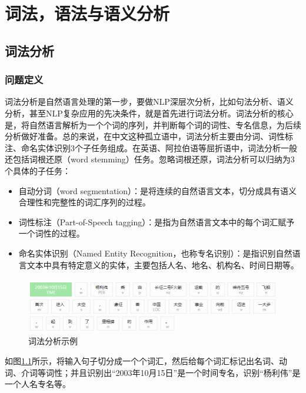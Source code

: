 
\chapter{词法，语法与语义分析}
\label{basic} %

\section{词法分析}
\subsection{问题定义}
词法分析是自然语言处理的第一步，要做NLP深层次分析，比如句法分析、语义分析，甚至NLP复杂应用的先决条件，就是首先进行词法分析。词法分析的核心是，将自然语言解析为一个个词的序列，并判断每个词的词性、专名信息，为后续分析做好准备。总的来说，在中文这种孤立语中，词法分析主要由分词、词性标注、命名实体识别3个子任务组成。在英语、阿拉伯语等屈折语中，词法分析一般还包括词根还原（word stemming）任务。忽略词根还原，词法分析可以归纳为3个具体的子任务：

\begin{itemize}
\item 自动分词（word segmentation）：是将连续的自然语言文本，切分成具有语义合理性和完整性的词汇序列的过程。
\item 词性标注（Part-of-Speech tagging）：是指为自然语言文本中的每个词汇赋予一个词性的过程。
\item 命名实体识别（Named Entity Recognition，也称专名识别）：是指识别自然语言文本中具有特定意义的实体，主要包括人名、地名、机构名、时间日期等。
\end{itemize}

\begin{figure}[h!]
\centering
\includegraphics[scale=0.5]{img/chapter_nlp/lexical_example.png}
\caption{词法分析示例}
\label{fig:lexical_example}
\end{figure}

如图\ref{fig:lexical_example}所示，将输入句子切分成一个个词汇，然后给每个词汇标记出名词、动词、介词等词性；并且识别出“2003年10月15日”是一个时间专名，识别“杨利伟”是一个人名专名等。

